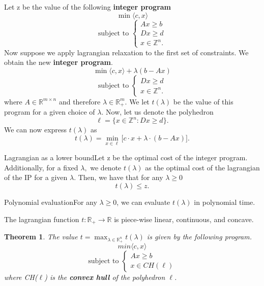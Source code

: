 \documentclass[twoside]{article}
\newcounter{lecnum}
\newtheorem{theorem}{Theorem}[lecnum]
\begin{document}
Let z be the value of the following \textbf{integer program}
$$
\min \langle c,x \rangle
$$
$$
\text{subject to } 
\begin{cases}
Ax \geq b\\
Dx \geq d\\
x \in \mathbb{Z}^n.
\end{cases}
$$
Now suppose we apply lagrangian relaxation to the first set of constraints. We obtain the new \textbf{integer program}.
$$
\min \langle c,x \rangle + \lambda(b - Ax)
$$
$$
\text{subject to } 
\begin{cases}
Dx \geq d\\
x \in \mathbb{Z}^n.
\end{cases}
$$
where $A \in \mathbb{R}^{m \times n}$ and therefore $\lambda \in \mathbb{R}_{+}^{m}.$ We let $t(\lambda)$ be the value of this program for a given choice of $\lambda.$ Now, let us denote the polyhedron 
$$
\ell = \bigg\{x \in \mathbb{Z}^n: Dx \geq d \bigg\}.
$$
We can now express $t(\lambda)$ as 
$$
t(\lambda) = \min_{x \in \ell}\bigg[c \cdot x + \lambda\cdot(b - Ax) \bigg].
$$
\begin{theorem_exam}{Lagrangian as a lower bound}{}Let z be the optimal cost of the integer program. Additionally, for a fixed $\lambda,$ we denote $t(\lambda)$ as the optimal cost of the lagrangian of the IP for a given $\lambda$. Then, we have that for any $\lambda \geq 0$
$$
t(\lambda) \leq z.
$$
\end{theorem_exam}

\begin{theorem_exam}{Polynomial evaluation}{}For any $\lambda \geq 0$, we can evaluate $t(\lambda)$ in polynomial time.
\end{theorem_exam}

\begin{theorem_exam}{}{}The lagrangian function $t: \mathbb{R}_{+} \rightarrow \mathbb{R}$ is piece-wise linear, continuous, and concave.
\end{theorem_exam}

\begin{theorem}The value $t = \max_{\lambda \in \mathbb{R}_{+}^{n}}t(\lambda)$ is given by the following program.
$$
min \langle c,x \rangle
$$
$$
\text{subject to }
\begin{cases}
Ax \geq b \\
x \in CH(\ell)
\end{cases}
$$
where CH($\ell$) is the \textbf{convex hull} of the polyhedron $\ell$.
\end{theorem}
\end{document}
